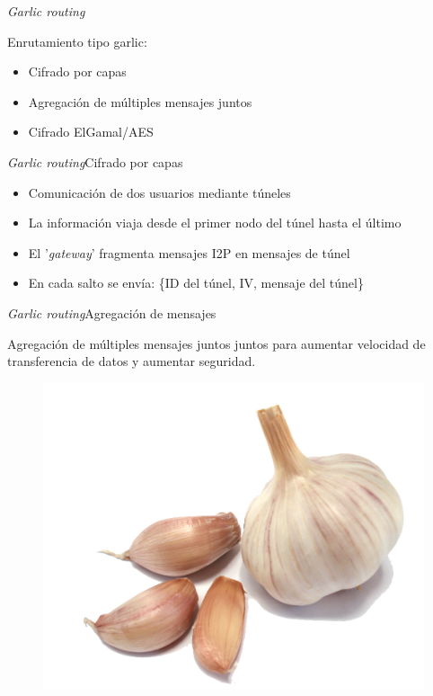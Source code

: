 \documentclass[spanish]{beamer}
\begin{document}
\begin{frame}{\textit{Garlic routing}}
	
Enrutamiento tipo garlic:


\begin{itemize}
	\item Cifrado por capas
	\item Agregación de múltiples mensajes juntos
	\item Cifrado ElGamal/AES
\end{itemize}
	
\end{frame}


\begin{frame}{\textit{Garlic routing}}{Cifrado por capas}
	
 
 
 \begin{itemize}
 	\item Comunicación de dos usuarios mediante túneles
 	\item La información viaja desde el primer nodo del túnel hasta el último
 	\item El '\textit{gateway}' fragmenta mensajes I2P en mensajes de túnel
 	\item En cada salto se envía: \{ID del túnel, IV, mensaje del túnel\}
 \end{itemize}
 
 
 \end{frame}
 
 
 \begin{frame}{\textit{Garlic routing}}{Agregación de mensajes}
 
 
 Agregación de múltiples mensajes juntos juntos para aumentar velocidad de transferencia de datos y aumentar seguridad.
 
 \begin{figure}
\centering
\includegraphics[width=.35\textwidth]{img/garlic}
\end{figure}

 	
 \end{frame}
 
\end{document}

